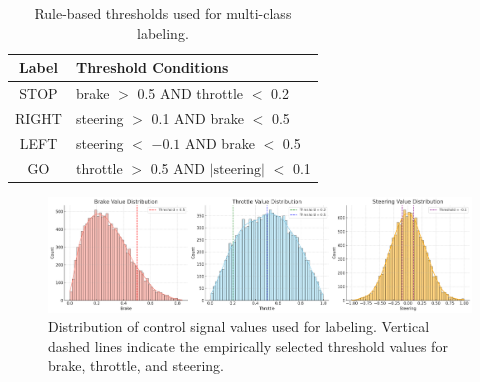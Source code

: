 \begin{table}[h]
    \centering
    \caption[Threshold rules for labeling]{Rule-based thresholds used for multi-class labeling.}
    \label{tab:label-thresholds}
    \begin{tabular}{|c|l|}
    \hline
    \textbf{Label} & \textbf{Threshold Conditions} \\ \hline
    STOP & brake $>$ 0.5 AND throttle $<$ 0.2 \\ \hline
    RIGHT & steering $>$ 0.1 AND brake $<$ 0.5 \\ \hline
    LEFT & steering $<$ $-0.1$ AND brake $<$ 0.5 \\ \hline
    GO & throttle $>$ 0.5 AND $|\text{steering}|$ $<$ 0.1 \\ \hline
    \end{tabular}
\end{table}


\vspace{5em} 


\begin{figure}[h]
    \centering
    \includegraphics[width=\textwidth]{img/dataset/data_distribution_for_driving.png} 
    \caption[Control signal distributions for labeling]{Distribution of control signal values used for labeling. Vertical dashed lines indicate the empirically selected threshold values for brake, throttle, and steering.}
    \label{fig:threshold-histograms}
\end{figure}